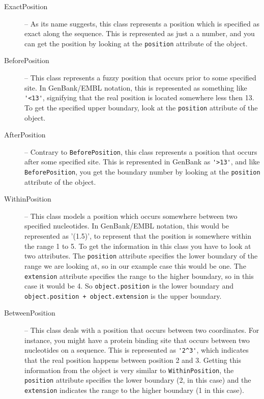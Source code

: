 \documentclass{report}
\begin{document}
\begin{description}
  \item[ExactPosition] -- As its name suggests, this class represents a position which is specified as exact along the sequence. This is represented as just a a number, and you can get the position by looking at the \verb|position| attribute of the object.

  \item[BeforePosition] -- This class represents a fuzzy position 
  that occurs prior to some specified site. In GenBank/EMBL notation, 
  this is represented as something like \verb|'<13'|, signifying that 
  the real position is located somewhere less then 13. To get 
  the specified upper boundary, look at the \verb|position| 
  attribute of the object.

  \item[AfterPosition] -- Contrary to \verb|BeforePosition|, this 
  class represents a position that occurs after some specified site. 
  This is represented in GenBank as \verb|'>13'|, and like 
  \verb|BeforePosition|, you get the boundary number by looking 
  at the \verb|position| attribute of the object.

  \item[WithinPosition] -- This class models a position which occurs somewhere between two specified nucleotides. In GenBank/EMBL notation, this would be represented as '(1.5)', to represent that the position is somewhere within the range 1 to 5. To get the information in this class you have to look at two attributes. The \verb|position| attribute specifies the lower boundary of the range we are looking at, so in our example case this would be one. The \verb|extension| attribute specifies the range to the higher boundary, so in this case it would be 4. So \verb|object.position| is the lower boundary and \verb|object.position + object.extension| is the upper boundary.

  \item[BetweenPosition] -- This class deals with a position that 
  occurs between two coordinates. For instance, you might have a 
  protein binding site that occurs between two nucleotides on a 
  sequence. This is represented as \verb|'2^3'|, which indicates that 
  the real position happens between position 2 and 3. Getting 
  this information from the object is very similar to 
  \verb|WithinPosition|, the \verb|position| attribute specifies 
  the lower boundary (2, in this case) and the \verb|extension| 
  indicates the range to the higher boundary (1 in this case).
\end{description}
\end{document}
